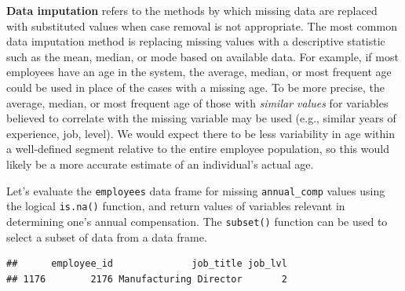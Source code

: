 \documentclass[
]{book}
\newenvironment{Shaded}{\begin{snugshade}}{\end{snugshade}}
\newcommand{\AttributeTok}[1]{\textcolor[rgb]{0.77,0.63,0.00}{#1}}
\newcommand{\CommentTok}[1]{\textcolor[rgb]{0.56,0.35,0.01}{\textit{#1}}}
\newcommand{\ConstantTok}[1]{\textcolor[rgb]{0.00,0.00,0.00}{#1}}
\newcommand{\FunctionTok}[1]{\textcolor[rgb]{0.00,0.00,0.00}{#1}}
\newcommand{\NormalTok}[1]{#1}
\newcommand{\OtherTok}[1]{\textcolor[rgb]{0.56,0.35,0.01}{#1}}
\newcommand{\SpecialCharTok}[1]{\textcolor[rgb]{0.00,0.00,0.00}{#1}}
\newcommand{\StringTok}[1]{\textcolor[rgb]{0.31,0.60,0.02}{#1}}
\begin{document}
\textbf{Data imputation} refers to the methods by which missing data are replaced with substituted values when case removal is not appropriate. The most common data imputation method is replacing missing values with a descriptive statistic such as the mean, median, or mode based on available data. For example, if most employees have an age in the system, the average, median, or most frequent age could be used in place of the cases with a missing age. To be more precise, the average, median, or most frequent age of those with \emph{similar values} for variables believed to correlate with the missing variable may be used (e.g., similar years of experience, job, level). We would expect there to be less variability in age within a well-defined segment relative to the entire employee population, so this would likely be a more accurate estimate of an individual's actual age.

Let's evaluate the \texttt{employees} data frame for missing \texttt{annual\_comp} values using the logical \texttt{is.na()} function, and return values of variables relevant in determining one's annual compensation. The \texttt{subset()} function can be used to select a subset of data from a data frame.

\begin{Shaded}
\end{Shaded}

\begin{verbatim}
##      employee_id              job_title job_lvl
## 1176        2176 Manufacturing Director       2
\end{verbatim}
\end{document}
